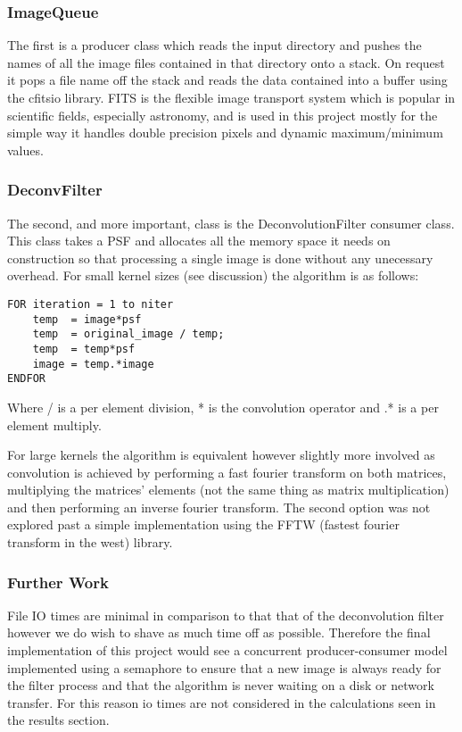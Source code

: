 \documentclass{article}
\begin{document}
\subsubsection{ImageQueue}
The first is a producer class which
reads the input directory and pushes the names of all the image files contained in that
directory onto a stack. On request it pops a file name off the stack and reads the
data contained into a buffer using the cfitsio library. FITS is the flexible
image transport system which is popular in scientific fields, especially
astronomy, and is used in this project mostly for the simple way it handles
double precision pixels and dynamic maximum/minimum values.

\subsubsection{DeconvFilter}
The second, and more important, class is the DeconvolutionFilter consumer class.
This class takes a PSF and allocates all the memory space it needs on
construction so that processing a single image is done without any unecessary
overhead. For small kernel sizes (see discussion) the algorithm is as follows:
\begin{verbatim}
FOR iteration = 1 to niter
    temp  = image*psf
    temp  = original_image / temp;
    temp  = temp*psf
    image = temp.*image
ENDFOR
\end{verbatim}
Where / is a per element division, * is the convolution operator and .* is a per
element multiply.

For large kernels the algorithm is equivalent however slightly more involved as
convolution is achieved by performing a fast fourier transform on both matrices,
multiplying the matrices' elements (not the same thing as matrix multiplication)
and then performing an inverse fourier transform. The second option was not
explored past a simple implementation using the FFTW (fastest fourier transform
in the west) library.

\subsubsection{Further Work}
File IO times are minimal in comparison to that that of the deconvolution filter
however we do wish to shave as much time off as possible. Therefore the final
implementation of this project would see a concurrent producer-consumer model
implemented using a semaphore to ensure that a new image is always ready for the
filter process and that the algorithm is never waiting on a disk or network
transfer. For this reason io times are not considered in the calculations seen
in the results section.
\end{document}
